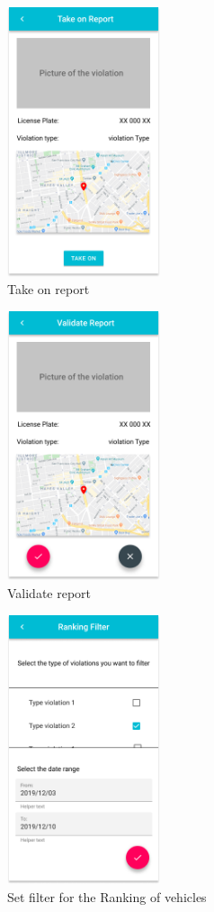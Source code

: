 \documentclass{article}
\begin{document}
\clearpage
\begin{figure}[!htb]
		\centering
		\includegraphics[height=7.9cm,keepaspectratio]{images/mockups/Report_Open_detail.png}
		\caption{Take on report}
\end{figure}

\begin{figure}[!htb]
		\centering
		\includegraphics[height=7.9cm,keepaspectratio]{images/mockups/Report_Open_detail_took_on.png}
		\caption{Validate report}
\end{figure}

\clearpage
\begin{figure}[!htb]
	\centering
	\includegraphics[height=7.9cm,keepaspectratio]{images/mockups/Ranking_Filter.png}
	\caption{Set filter for the Ranking of vehicles}
\end{figure}
\end{document}
